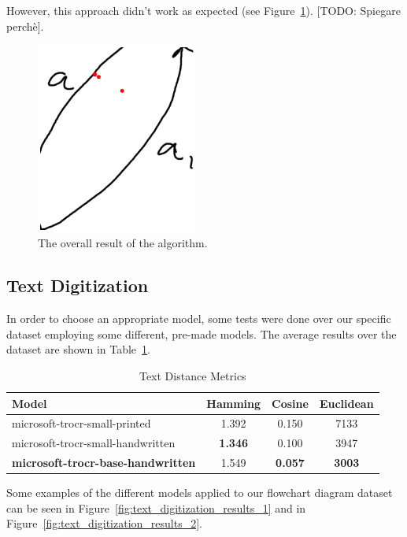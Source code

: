 \documentclass[conference]{IEEEtran}
\begin{document}
However, this approach didn't work as expected (see Figure~\ref{fig:template_matching_fail}). [TODO: Spiegare perchè].

\begin{figure}[H]
\centering
\includegraphics[width=150pt]{template_matching_fail.png}
\caption{The overall result of the algorithm.}
\label{fig:template_matching_fail}
\end{figure}

\subsection{Text Digitization}
In order to choose an appropriate model, some tests were done over our specific dataset employing some different, pre-made models. The average results over the dataset are shown in Table~\ref{tab:text_digitization}.

\begin{table}[htbp]
\caption{Text Distance Metrics}
\centering
\begin{tabular}{lccc}
\hline
\textbf{Model} & \textbf{Hamming} & \textbf{Cosine} & \textbf{Euclidean} \\
\hline
microsoft-trocr-small-printed & 1.392 & 0.150 & 7133 \\
microsoft-trocr-small-handwritten & \textbf{1.346} & 0.100  & 3947 \\ \hline \textbf{microsoft-trocr-base-handwritten} & 1.549 & \textbf{0.057} & \textbf{3003} \\
\hline
\end{tabular}
\label{tab:text_digitization}
\end{table}

Some examples of the different models applied to our flowchart diagram dataset can be seen in Figure~\ref{fig:text_digitization_results_1} and in Figure~\ref{fig:text_digitization_results_2}.
\end{document}
